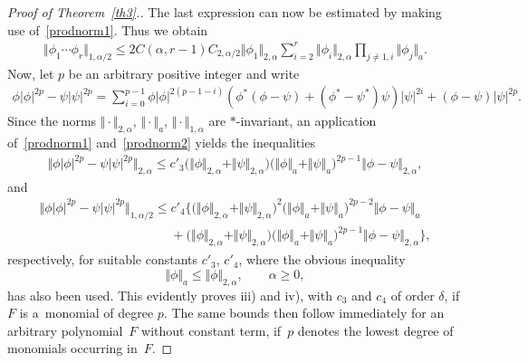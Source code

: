 \documentclass[11pt]{article}
\begin{document}
\begin{proof}[Proof of Theorem~\ref{th3}.]
The last expression can now be estimated by making use of~\eqref{prodnorm1}. Thus we obtain
\begin{gather}\label{prodnorm2}
\Vert\phi_1\cdots\phi_r\Vert_{1,\alpha/2}
\leq 2 C(\alpha,r-1)C_{2,\alpha/2} \Vert\phi_1\Vert_{2,\alpha} \sum_{i=2}^r\Vert\phi_i\Vert_{2,\alpha}
\prod_{j\ne 1,i}\Vert\phi_j\Vert_a .
\end{gather}
Now, let $p$ be an arbitrary positive integer and write
\begin{gather*}
\phi |\phi|^{2p}-\psi |\psi|^{2p}
=\sum_{i=0}^{p-1}\phi |\phi|^{2(p-1-i)}
(\phi^* (\phi-\psi)+(\phi^*-\psi^*) \psi) |\psi|^{2i}
+(\phi-\psi) |\psi|^{2p} .
\end{gather*}
Since the norms $\Vert\cdot\Vert_{2,\alpha}$, $\Vert\cdot\Vert_a$, $\Vert\cdot\Vert_{1,\alpha}$
are  $*$-invariant, an application of~\eqref{prodnorm1}
and~\eqref{prodnorm2} yields the inequalities
\begin{gather*}
\Vert\phi |\phi|^{2p}-\psi |\psi|^{2p}\Vert_{2,\alpha}
\leq c'_3 \big(\Vert\phi\Vert_{2,\alpha}+\Vert\psi\Vert_{2,\alpha}\big)
\big(\Vert\phi\Vert_a+\Vert\psi\Vert_a\big)^{2p-1}\Vert\phi-\psi\Vert_{2,\alpha} ,
\end{gather*}
and
\begin{gather*}
 \Vert\phi |\phi|^{2p}-\psi |\psi|^{2p}\Vert_{1,\alpha/2}
 \leq c'_4
\Big\{\big(\Vert\phi\Vert_{2,\alpha}+\Vert\psi\Vert_{2,\alpha}\big)^2
\big(\Vert\phi\Vert_a+\Vert\psi\Vert_a\big)^{2p-2}\Vert\phi-\psi\Vert_a\\
\phantom{\Vert\phi |\phi|^{2p}-\psi |\psi|^{2p}\Vert_{1,\alpha/2}\leq}{}
+
\big(\Vert\phi\Vert_{2,\alpha}+\Vert\psi\Vert_{2,\alpha}\big)
\big(\Vert\phi\Vert_a+\Vert\psi\Vert_a\big)^{2p-1}\Vert\phi-\psi\Vert_{2,\alpha}\Big\} ,
\end{gather*}
respectively, for suitable constants $c'_3$, $c'_4$, where the
obvious inequality
\[
\Vert\phi\Vert_a \leq \Vert\phi\Vert_{2,\alpha} ,\qquad \alpha\geq 0 ,
\]
has also been used. This evidently proves iii) and iv), with $c_3$ and
$c_4$ of order $\delta$, if $F$ is a~monomial of degree $p$. The same bounds then follow immediately for an
arbitrary polynomial~$F$ without constant term, if~$p$ denotes the
lowest degree of monomials occurring in~$F$.
\end{proof}
\end{document}
